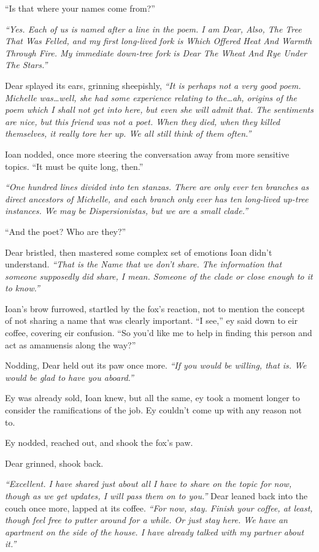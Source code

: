``Is that where your names come from?''

\emph{``Yes. Each of us is named after a line in the poem. I am Dear, Also, The Tree That Was Felled, and my first long-lived fork is Which Offered Heat And Warmth Through Fire. My immediate down-tree fork is Dear The Wheat And Rye Under The Stars.''}

Dear splayed its ears, grinning sheepishly, \emph{``It is perhaps not a very good poem. Michelle was\ldots{}well, she had some experience relating to the\ldots{}ah, origins of the poem which I shall not get into here, but even she will admit that. The sentiments are nice, but this friend was not a poet. When they died, when they killed themselves, it really tore her up. We all still think of them often.''}

Ioan nodded, once more steering the conversation away from more sensitive topics. ``It must be quite long, then.''

\emph{``One hundred lines divided into ten stanzas. There are only ever ten branches as direct ancestors of Michelle, and each branch only ever has ten long-lived up-tree instances. We may be Dispersionistas, but we are a small clade.''}

``And the poet? Who are they?''

Dear bristled, then mastered some complex set of emotions Ioan didn't understand. \emph{``That is the Name that we don't share. The information that someone supposedly did share, I mean. Someone of the clade or close enough to it to know.''}

Ioan's brow furrowed, startled by the fox's reaction, not to mention the concept of not sharing a name that was clearly important. ``I see,'' ey said down to eir coffee, covering eir confusion. ``So you'd like me to help in finding this person and act as amanuensis along the way?''

Nodding, Dear held out its paw once more. \emph{``If you would be willing, that is. We would be glad to have you aboard.''}

Ey was already sold, Ioan knew, but all the same, ey took a moment longer to consider the ramifications of the job. Ey couldn't come up with any reason not to.

Ey nodded, reached out, and shook the fox's paw.

Dear grinned, shook back.

\emph{``Excellent. I have shared just about all I have to share on the topic for now, though as we get updates, I will pass them on to you.''} Dear leaned back into the couch once more, lapped at its coffee. \emph{``For now, stay. Finish your coffee, at least, though feel free to putter around for a while. Or just stay here. We have an apartment on the side of the house. I have already talked with my partner about it.''}


